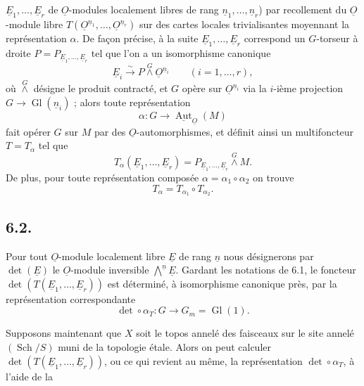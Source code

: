 \documentclass{article}
\newcommand{\Aut}{\operatorname{Aut}}
\newcommand{\Gl}{\operatorname{Gl}}
\newcommand{\Sch}{\operatorname{Sch}}
\begin{document}
\clearpage
\(\underline{E}_1,\ldots,\underline{E}_r\) de \(\underline{O}\)-modules localement libres de rang \(\underline{n}_1,\ldots,\underline{n}_r\)) par recollement du \(\underline{O}\)-module libre \(T(\underline{O}^{\underline{n}_1},\ldots,\underline{O}^{\underline{n}_r})\) sur des cartes locales trivialisantes moyennant la représentation \(\alpha\). De façon précise, à la suite \(\underline{E}_1,\ldots,\underline{E}_r\) correspond un \(G\)-torseur à droite \(P=P_{\underline{E}_1,\ldots,\underline{E}_r}\) tel que l'on a un isomorphisme canonique
\begin{equation}\tag{6.1.3}
 \underline{E}_i\xrightarrow{\sim}P\overset{G}{\wedge}\underline{O}^{\underline{n}_i}\qquad(i=1,\ldots,r),
\end{equation}
où \(\overset{G}{\wedge}\) désigne le produit contracté, et \(G\) opère sur \(\underline{O}^{\underline{n}_i}\) via la \(i\)-ième projection \(G\to\Gl(\underline{n}_i)\) ; alors toute représentation
\[
 \alpha:G\longrightarrow\underline{\Aut}_{\underline{O}}(M)
\]
fait opérer \(G\) sur \(M\) par des \(\underline{O}\)-automorphismes, et définit ainsi un multifoncteur \(T=T_\alpha\) tel que
\begin{equation}\tag{6.1.4}
 T_\alpha(\underline{E}_1,\ldots,\underline{E}_r)=P_{\underline{E}_1,\ldots,\underline{E}_r}\overset{G}{\wedge} M.
\end{equation}
De plus, pour toute représentation composée \(\alpha=\alpha_1\circ\alpha_2\) on trouve
\begin{equation}\tag{6.1.5}
 T_\alpha=T_{\alpha_1}\circ T_{\alpha_2}.
\end{equation}

\subsection*{6.2.}
Pour tout \(\underline{O}\)-module localement libre \(\underline{E}\) de rang \(\underline{n}\) nous désignerons par \(\det(\underline{E})\) le \(\underline{O}\)-module inversible \(\bigwedge\limits^{\underline{n}} \underline{E}\). Gardant les notations de 6.1, le foncteur \(\det(T(\underline{E}_1,\ldots,\underline{E}_r))\) est déterminé, à isomorphisme canonique près, par la représentation correspondante
\begin{equation}\tag{6.2.1}
 \det\circ\alpha_T:G\longrightarrow{G}_m=\Gl(1).
\end{equation}

Supposons maintenant que \(X\) soit le topos annelé des faisceaux sur le site annelé \((\Sch/S)\) muni de la topologie étale. Alors on peut calculer \(\det(T(\underline{E}_1,\ldots,\underline{E}_r))\), ou ce qui revient au même, la représentation \(\det\circ\alpha_T\), à l'aide de la
\end{document}
